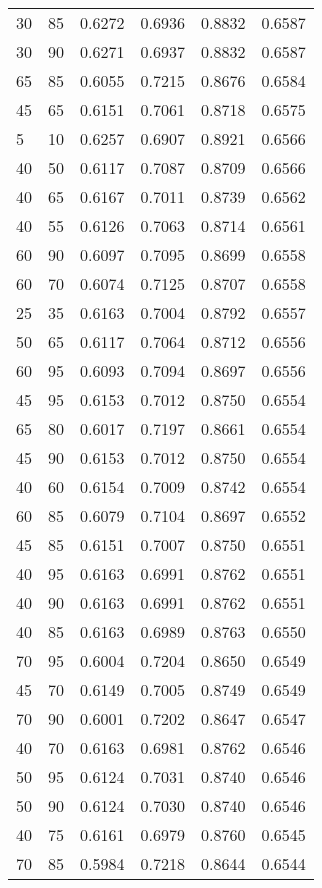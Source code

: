 \begin{center}
\begin{longtable}{|l|l|l|l|l|l|}
30 & 85 & 0.6272 & 0.6936 & 0.8832 & 0.6587 \\
30 & 90 & 0.6271 & 0.6937 & 0.8832 & 0.6587 \\
65 & 85 & 0.6055 & 0.7215 & 0.8676 & 0.6584 \\
45 & 65 & 0.6151 & 0.7061 & 0.8718 & 0.6575 \\
5  & 10 & 0.6257 & 0.6907 & 0.8921 & 0.6566 \\
40 & 50 & 0.6117 & 0.7087 & 0.8709 & 0.6566 \\
40 & 65 & 0.6167 & 0.7011 & 0.8739 & 0.6562 \\
40 & 55 & 0.6126 & 0.7063 & 0.8714 & 0.6561 \\
60 & 90 & 0.6097 & 0.7095 & 0.8699 & 0.6558 \\
60 & 70 & 0.6074 & 0.7125 & 0.8707 & 0.6558 \\
25 & 35 & 0.6163 & 0.7004 & 0.8792 & 0.6557 \\
50 & 65 & 0.6117 & 0.7064 & 0.8712 & 0.6556 \\
60 & 95 & 0.6093 & 0.7094 & 0.8697 & 0.6556 \\
45 & 95 & 0.6153 & 0.7012 & 0.8750 & 0.6554 \\
65 & 80 & 0.6017 & 0.7197 & 0.8661 & 0.6554 \\
45 & 90 & 0.6153 & 0.7012 & 0.8750 & 0.6554 \\
40 & 60 & 0.6154 & 0.7009 & 0.8742 & 0.6554 \\
60 & 85 & 0.6079 & 0.7104 & 0.8697 & 0.6552 \\
45 & 85 & 0.6151 & 0.7007 & 0.8750 & 0.6551 \\
40 & 95 & 0.6163 & 0.6991 & 0.8762 & 0.6551 \\
40 & 90 & 0.6163 & 0.6991 & 0.8762 & 0.6551 \\
40 & 85 & 0.6163 & 0.6989 & 0.8763 & 0.6550 \\
70 & 95 & 0.6004 & 0.7204 & 0.8650 & 0.6549 \\
45 & 70 & 0.6149 & 0.7005 & 0.8749 & 0.6549 \\
70 & 90 & 0.6001 & 0.7202 & 0.8647 & 0.6547 \\
40 & 70 & 0.6163 & 0.6981 & 0.8762 & 0.6546 \\
50 & 95 & 0.6124 & 0.7031 & 0.8740 & 0.6546 \\
50 & 90 & 0.6124 & 0.7030 & 0.8740 & 0.6546 \\
40 & 75 & 0.6161 & 0.6979 & 0.8760 & 0.6545 \\
70 & 85 & 0.5984 & 0.7218 & 0.8644 & 0.6544 \\

\end{longtable}
\end{center}
